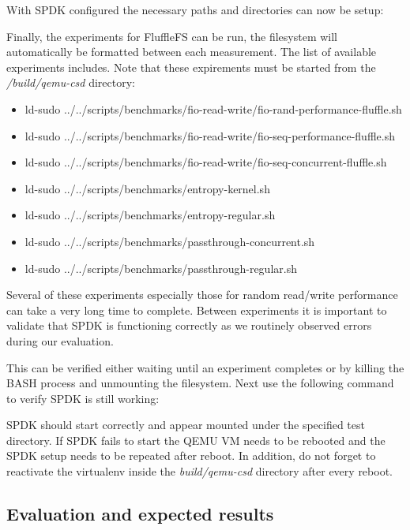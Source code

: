 
With SPDK configured the necessary paths and directories can now be setup:


Finally, the experiments for FluffleFS can be run, the filesystem will
automatically be formatted between each measurement. The list of available
experiments includes. Note that these expirements must be started from the
\textit{/build/qemu-csd} directory:

\begin{itemize}
    \item ld-sudo ../../scripts/benchmarks/fio-read-write/fio-rand-performance-fluffle.sh
    \item ld-sudo ../../scripts/benchmarks/fio-read-write/fio-seq-performance-fluffle.sh
    \item ld-sudo ../../scripts/benchmarks/fio-read-write/fio-seq-concurrent-fluffle.sh
    \item ld-sudo ../../scripts/benchmarks/entropy-kernel.sh
    \item ld-sudo ../../scripts/benchmarks/entropy-regular.sh
    \item ld-sudo ../../scripts/benchmarks/passthrough-concurrent.sh
    \item ld-sudo ../../scripts/benchmarks/passthrough-regular.sh
\end{itemize}

Several of these experiments especially those for random read/write performance
can take a very long time to complete. Between experiments it is important to
validate that SPDK is functioning correctly as we routinely observed errors
during our evaluation.

This can be verified either waiting until an experiment completes or by killing
the BASH process and unmounting the filesystem. Next use the following command
to verify SPDK is still working:


SPDK should start correctly and appear mounted under the specified test
directory. If SPDK fails to start the QEMU VM needs to be rebooted and the SPDK
setup needs to be repeated after reboot. In addition, do not forget to
reactivate the virtualenv inside the \textit{build/qemu-csd} directory after
every reboot.

\subsection{Evaluation and expected results}

